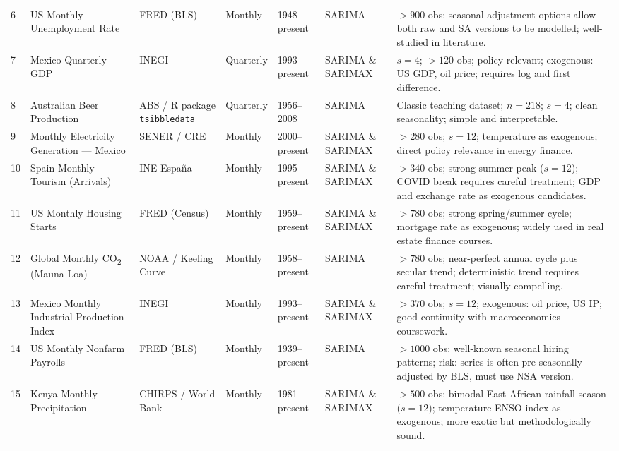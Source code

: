 \documentclass[12pt,a4paper]{article}
\begin{document}
\begin{longtable}{p{} p{} p{} p{} p{} p{} p{}}
6 & US Monthly Unemployment Rate & FRED (BLS) & Monthly & 1948–present & SARIMA & $>900$ obs; seasonal adjustment options allow both raw and SA versions to be modelled; well-studied in literature. \\[4pt]

7 & Mexico Quarterly GDP & INEGI & Quarterly & 1993–present & SARIMA \& SARIMAX & $s=4$; $>120$ obs; policy-relevant; exogenous: US GDP, oil price; requires log and first difference. \\[4pt]

8 & Australian Beer Production & ABS / R package \texttt{tsibbledata} & Quarterly & 1956–2008 & SARIMA & Classic teaching dataset; $n=218$; $s=4$; clean seasonality; simple and interpretable. \\[4pt]

9 & Monthly Electricity Generation — Mexico & SENER / CRE & Monthly & 2000–present & SARIMA \& SARIMAX & $>280$ obs; $s=12$; temperature as exogenous; direct policy relevance in energy finance. \\[4pt]

10 & Spain Monthly Tourism (Arrivals) & INE España & Monthly & 1995–present & SARIMA \& SARIMAX & $>340$ obs; strong summer peak ($s=12$); COVID break requires careful treatment; GDP and exchange rate as exogenous candidates. \\[4pt]

11 & US Monthly Housing Starts & FRED (Census) & Monthly & 1959–present & SARIMA \& SARIMAX & $>780$ obs; strong spring/summer cycle; mortgage rate as exogenous; widely used in real estate finance courses. \\[4pt]

12 & Global Monthly CO\textsubscript{2} (Mauna Loa) & NOAA / Keeling Curve & Monthly & 1958–present & SARIMA & $>780$ obs; near-perfect annual cycle plus secular trend; deterministic trend requires careful treatment; visually compelling. \\[4pt]

13 & Mexico Monthly Industrial Production Index & INEGI & Monthly & 1993–present & SARIMA \& SARIMAX & $>370$ obs; $s=12$; exogenous: oil price, US IP; good continuity with macroeconomics coursework. \\[4pt]

14 & US Monthly Nonfarm Payrolls & FRED (BLS) & Monthly & 1939–present & SARIMA & $>1000$ obs; well-known seasonal hiring patterns; risk: series is often pre-seasonally adjusted by BLS, must use NSA version. \\[4pt]

15 & Kenya Monthly Precipitation & CHIRPS / World Bank & Monthly & 1981–present & SARIMA \& SARIMAX & $>500$ obs; bimodal East African rainfall season ($s=12$); temperature ENSO index as exogenous; more exotic but methodologically sound. \\[4pt]
\end{longtable}
\end{document}
